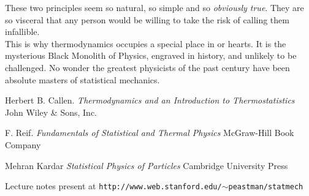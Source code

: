 \documentclass[oneside]{book}
\begin{document}
These two principles seem so natural, so simple and so \emph{obviously true}. They are so visceral that any person would be willing to take the risk of calling them infallible. \\

This is why thermodynamics occupies a special place in or hearts. It is the mysterious Black Monolith of Physics, engraved in history, and unlikely to be challenged.  No wonder the greatest physicists of the past century have been absolute masters of statistical mechanics. \\






    
   
    
\begin{thebibliography}{9}

Herbert B. Callen.
\emph{Thermodynamics and an Introduction to Thermostatistics}
John Wiley \& Sons, Inc.

F. Reif.
\textit{Fundamentals of Statistical and Thermal Physics}
McGraw-Hill Book Company

Mehran Kardar
\textit{Statistical Physics of Particles}
Cambridge University Press

Lecture notes present at
\texttt{http://www.web.stanford.edu/$\sim$peastman/statmech}



\end{thebibliography}
    
   
    
    
\end{document}
